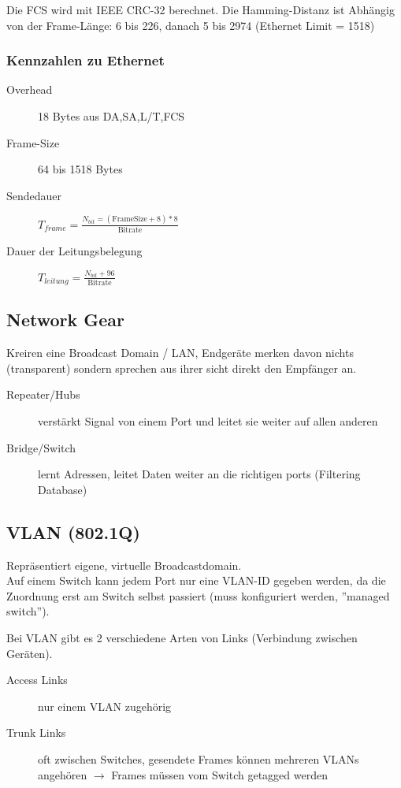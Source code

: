 Die FCS wird mit IEEE CRC-32 berechnet. Die Hamming-Distanz ist Abhängig von der
Frame-Länge: 6 bis 226, danach 5 bis 2974 (Ethernet Limit = 1518)

\subsubsection{Kennzahlen zu Ethernet}
\begingroup
\large
\begin{description}
	\item[Overhead] 18 Bytes aus DA,SA,L/T,FCS
	\item[Frame-Size] 64 bis 1518 Bytes
	\item[Sendedauer] $T_{frame} =
			\frac{N_{bit} = (\text{FrameSize} + 8) * 8}{\text{Bitrate}}$
	\item[Dauer der Leitungsbelegung] $T_{leitung}
			= \frac{N_{bit} + 96}{\text{Bitrate}}$
\end{description}
\endgroup




\subsection{Network Gear}

Kreiren eine Broadcast Domain / LAN, Endgeräte merken davon nichts (transparent)
sondern sprechen aus ihrer sicht direkt den Empfänger an.

\begin{description}
	\item[Repeater/Hubs] verstärkt Signal von einem Port und leitet sie weiter
		auf allen anderen
	\item[Bridge/Switch] lernt Adressen, leitet Daten weiter an
		die richtigen ports (Filtering Database)
\end{description}



\subsection{VLAN (802.1Q)}

Repräsentiert eigene, virtuelle Broadcastdomain. \\
Auf einem Switch kann jedem Port nur eine VLAN-ID gegeben werden, da die Zuordnung
erst am Switch selbst passiert (muss konfiguriert werden, ''managed switch'').

Bei VLAN gibt es 2 verschiedene Arten von Links (Verbindung zwischen Geräten).
\begin{description}
	\item[Access Links] nur einem VLAN zugehörig
	\item[Trunk Links] oft zwischen Switches, gesendete Frames können mehreren VLANs
		angehören $\rightarrow$ Frames müssen vom Switch getagged werden
\end{description}

